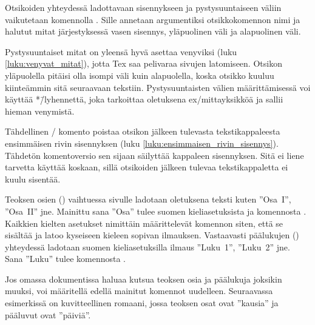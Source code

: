 Otsikoiden yhteydessä ladottavaan sisennykseen ja pystysuuntaiseen
väliin vaikutetaan komennolla . Sille annetaan
argumentiksi otsikkokomennon nimi ja halutut mitat järjestyksessä vasen
sisennys, yläpuolinen väli ja alapuolinen väli.

\begin{koodilohkosis}
\end{koodilohkosis}

Pystysuuntaiset mitat on yleensä hyvä asettaa venyviksi (luku
\ref{luku:venyvat_mitat}), jotta Tex saa pelivaraa sivujen latomiseen.
Otsikon yläpuolella pitäisi olla isompi väli kuin alapuolella, koska
otsikko kuuluu kiinteämmin sitä seuraavaan tekstiin. Pystysuuntaisten
välien määrittämisessä voi käyttää *\=/lyhennettä, joka tarkoittaa
oletuksena ex\-/mittayksikköä ja sallii hieman venymistä.

\begin{koodilohkosis}
\end{koodilohkosis}

Tähdellinen \-/ komento poistaa otsikon jälkeen
tulevasta tekstikappaleesta ensimmäisen rivin sisennyksen (luku
\ref{luku:ensimmaisen_rivin_sisennys}). Tähdetön komentoversio
 sen sijaan säilyttää kappaleen sisennyksen. Sitä
ei liene tarvetta käyttää koskaan, sillä otsikoiden jälkeen tulevaa
tekstikappaletta ei kuulu sisentää.

Teoksen osien () vaihtuessa sivulle ladotaan oletuksena
teksti kuten ''Osa~I'', ''Osa~II'' jne. Mainittu sana ''Osa'' tulee
suomen kieliasetuksista ja komennosta . Kaikkien
kielten asetukset nimittäin määrittelevät komennon 
siten, että se sisältää ja latoo kyseiseen kieleen sopivan ilmauksen.
Vastaavasti päälukujen () yhteydessä ladotaan suomen
kieliasetuksilla ilmaus ''Luku~1'', ''Luku~2'' jne. Sana ''Luku'' tulee
komennosta .

Jos omassa dokumentissa haluaa kutsua teoksen osia ja päälukuja joksikin
muuksi, voi määritellä edellä mainitut komennot uudelleen. Seuraavassa
esimerkissä on kuvitteellinen romaani, jossa teoksen osat ovat
''kausia'' ja pääluvut ovat ''päiviä''.

